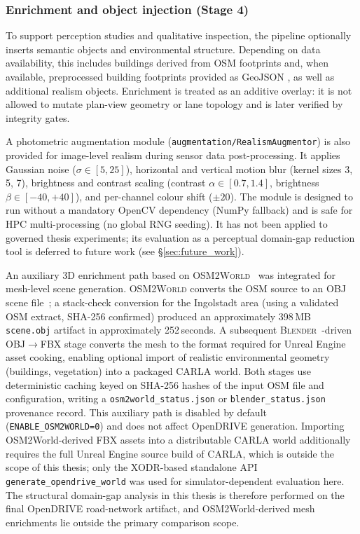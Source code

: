 \subsubsection{Enrichment and object injection (Stage 4)}
To support perception studies and qualitative inspection, the pipeline optionally inserts semantic objects and environmental structure. Depending on data availability, this includes buildings derived from OSM footprints and, when available, preprocessed building footprints provided as GeoJSON \cite{rfc7946}, as well as additional realism objects. Enrichment is treated as an additive overlay: it is not allowed to mutate plan-view geometry or lane topology and is later verified by integrity gates.

A photometric augmentation module (\texttt{augmentation/RealismAugmentor}) is also provided for image-level realism during sensor data post-processing. It applies Gaussian noise ($\sigma \in [5, 25]$), horizontal and vertical motion blur (kernel sizes 3, 5, 7), brightness and contrast scaling (contrast $\alpha \in [0.7, 1.4]$, brightness $\beta \in [-40, +40]$), and per-channel colour shift ($\pm 20$). The module is designed to run without a mandatory OpenCV dependency (NumPy fallback) and is safe for HPC multi-processing (no global RNG seeding). It has not been applied to governed thesis experiments; its evaluation as a perceptual domain-gap reduction tool is deferred to future work (see §\ref{sec:future_work}).

An auxiliary 3D enrichment path based on \textsc{OSM2World}~\cite{osm2world} was integrated for mesh-level
scene generation. \textsc{OSM2World} converts the OSM source to an \textsc{OBJ} scene file~\cite{osm2world};
a stack-check conversion for the Ingolstadt area (using a validated OSM extract, SHA-256 confirmed)
produced an approximately 398\,MB \texttt{scene.obj} artifact in approximately 252\,seconds.
A subsequent \textsc{Blender}~\cite{blender}-driven OBJ$\to$\textsc{FBX} stage
converts the mesh to the format required for Unreal Engine asset cooking, enabling optional
import of realistic environmental geometry (buildings, vegetation) into a packaged CARLA world.
Both stages use deterministic caching keyed on SHA-256 hashes of the input OSM file and
configuration, writing a \texttt{osm2world\_status.json} or \texttt{blender\_status.json}
provenance record. This auxiliary path is disabled by default (\texttt{ENABLE\_OSM2WORLD=0})
and does not affect OpenDRIVE generation. Importing OSM2World-derived FBX assets into
a distributable CARLA world additionally requires the full Unreal Engine source build of CARLA,
which is outside the scope of this thesis; only the XODR-based standalone API
\texttt{generate\_opendrive\_world} was used for simulator-dependent evaluation here.
The structural domain-gap analysis in this thesis is therefore performed on the final
OpenDRIVE road-network artifact, and OSM2World-derived mesh enrichments lie outside
the primary comparison scope.

